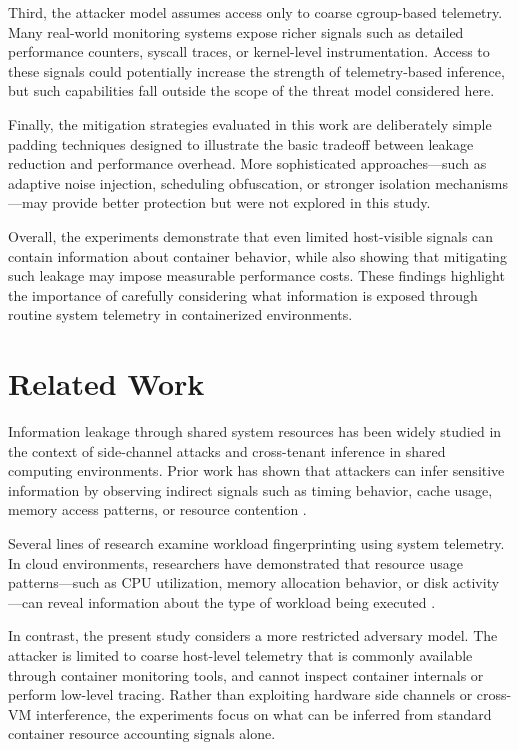 \documentclass[11pt]{article}
\begin{document}
Third, the attacker model assumes access only to coarse cgroup-based telemetry. Many real-world monitoring systems expose richer signals such as detailed performance counters, syscall traces, or kernel-level instrumentation. Access to these signals could potentially increase the strength of telemetry-based inference, but such capabilities fall outside the scope of the threat model considered here.

Finally, the mitigation strategies evaluated in this work are deliberately simple padding techniques designed to illustrate the basic tradeoff between leakage reduction and performance overhead. More sophisticated approaches---such as adaptive noise injection, scheduling obfuscation, or stronger isolation mechanisms---may provide better protection but were not explored in this study.

Overall, the experiments demonstrate that even limited host-visible signals can contain information about container behavior, while also showing that mitigating such leakage may impose measurable performance costs. These findings highlight the importance of carefully considering what information is exposed through routine system telemetry in containerized environments.

\section{Related Work}

Information leakage through shared system resources has been widely studied in the context of side-channel attacks and cross-tenant inference in shared computing environments. Prior work has shown that attackers can infer sensitive information by observing indirect signals such as timing behavior, cache usage, memory access patterns, or resource contention \cite{kocher1996timing, ristenpart2009hey}.

Several lines of research examine workload fingerprinting using system telemetry. In cloud environments, researchers have demonstrated that resource usage patterns---such as CPU utilization, memory allocation behavior, or disk activity---can reveal information about the type of workload being executed \cite{zhang2012cross, xu2015controlled}.

In contrast, the present study considers a more restricted adversary model. The attacker is limited to coarse host-level telemetry that is commonly available through container monitoring tools, and cannot inspect container internals or perform low-level tracing. Rather than exploiting hardware side channels or cross-VM interference, the experiments focus on what can be inferred from standard container resource accounting signals alone.
\end{document}
